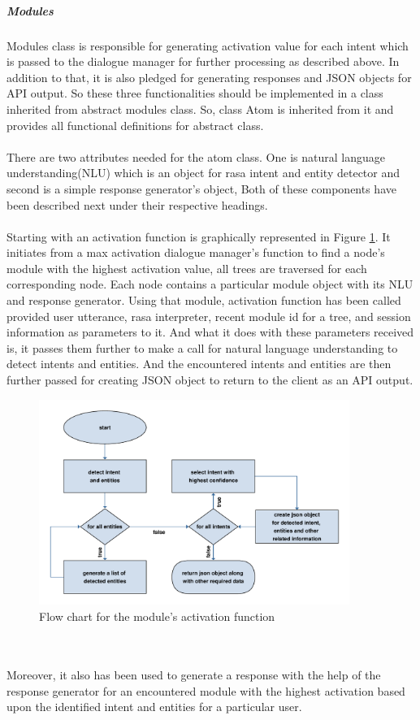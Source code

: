 \subparagraph*{Modules} Modules class is responsible for generating activation value for each intent which is passed to the dialogue manager for further processing as described above. In addition to that, it is also pledged for generating responses and JSON objects for API output. So these three functionalities should be implemented in a class inherited from abstract modules class. So, class Atom is inherited from it and provides all functional definitions for abstract class. 
\\~\\
There are two attributes needed for the atom class. One is natural language understanding(NLU) which is an object for rasa intent and entity detector and second is a simple response generator's object, Both of these components have been described next under their respective headings. 
\\~\\
Starting with an activation function is graphically represented in Figure \ref{fig:flowModule}. It initiates from a max activation dialogue manager's function to find a node's module with the highest activation value, all trees are traversed for each corresponding node. Each node contains a particular module object with its NLU and response generator. Using that module, activation function has been called provided user utterance, rasa interpreter, recent module id for a tree, and session information as parameters to it. And what it does with these parameters received is, it passes them further to make a call for natural language understanding to detect intents and entities. And the encountered intents and entities are then further passed for creating JSON object to return to the client as an API output. 

\begin{figure}[!h]
    \centering
    \includegraphics[width=0.9\textwidth]{img/module.pdf}
    \caption{Flow chart for the module's activation function}
    \label{fig:flowModule}
\end{figure}
\\~\\
Moreover, it also has been used to generate a response with the help of the response generator for an encountered module with the highest activation based upon the identified intent and entities for a particular user.

